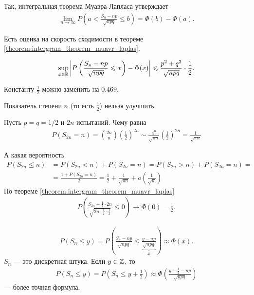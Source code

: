 \documentclass[../main.tex]{subfiles}
\begin{document}
Так, интегральная теорема Муавра-Лапласа утверждает
\begin{align*}
 \lim_{n \to \infty} P \left( a < \frac{S_n-np}{\sqrt{npq}} \leqslant b \right) =\Phi(b)-\Phi(a).
\end{align*}

Есть оценка на скорость сходимости в теореме \ref{theorem:intergram_theorem_muavr_laplas}.

\begin{thm}
 \begin{align*}
  \sup_{x \in \mathbb{R}} \left| P \left( \frac{S_n - np}{\sqrt{npq}} \leqslant x \right) - \Phi(x) \right| \leqslant \frac{p^{2}+q^{2}}{\sqrt{npq}} \cdot \frac{1}{2}
 .\end{align*}
\end{thm}

\begin{remrk*}
 Константу $\frac{1}{2}$ можно заменить на $0.469$.
\end{remrk*}

\begin{remrk*}
 Показатель степени $n$ (то есть $\frac{1}{2}$) нельзя улучшить.
\end{remrk*}



\begin{exmpl*}
 Пусть $p = q = 1 / 2$ и  $2n$ испытаний. Чему равна
 \begin{align*}
  P(S_{2n} = n) = \binom {2n} n \left( \frac{1}{2} \right)^{2n} \sim \frac{4^{n}}{\sqrt{\pi n}} \left( \frac{1}{2} \right)^{2n} = \frac{1}{\sqrt{\pi n}}
 \end{align*} 

 А какая вероятность
 \begin{align*}
  P(S_{2n} \leqslant n) &= P(S_{2n} < n) + P(S_{2n} = n) = P(S_{2n} > n) + P(S_{2n} = n) = \\
  &= \frac{1 + P(S_{2n} = n)}{2} = \frac{1}{2} + \frac{1}{\sqrt{\pi n}} + o \left( \frac{1}{\sqrt{n}} \right)
 \end{align*} По теореме \ref{theorem:intergram_theorem_muavr_laplas}
 \begin{align*}
  P\left(\frac{S_{2n} - \frac{1}{2} \cdot 2n}{\sqrt{2n \cdot \frac{1}{2} \cdot \frac{1}{2}}} \leqslant 0\right) \to \Phi(0) = \frac{1}{2}.
 \end{align*} 
\end{exmpl*}

\begin{remrk*}
 \begin{align*}
  P(S_n \leqslant y) = P\left(\frac{S_n - np}{\sqrt{npq}} \leqslant \underbrace{\frac{y - np}{\sqrt{npq}}}_{x}\right) \approx \Phi(x)
 .\end{align*} $S_n$ --- это дискретная штука. Если  $y \in \mathbb{Z}$, то
 \begin{align*}
  P(S_n \leqslant y) = P\left(S_n \leqslant y + \frac{1}{2}\right) \approx \Phi \left( \frac{y + \frac{1}{2} - np}{\sqrt{npq}} \right)
 \end{align*} --- более точная формула.
\end{remrk*}
\end{document}
